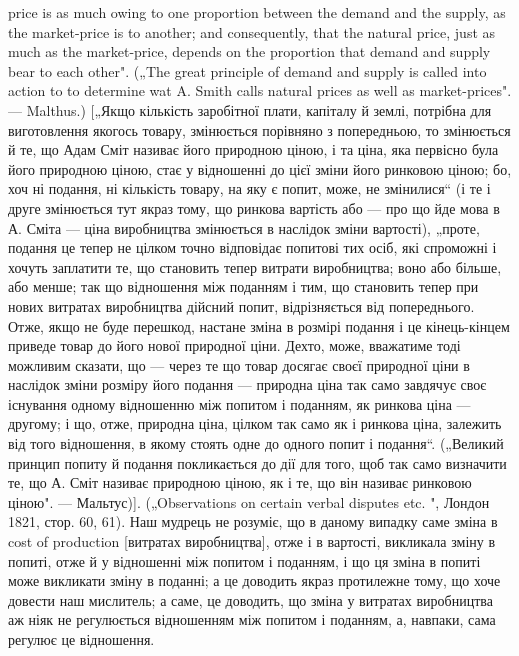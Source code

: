 price is as much owing to one proportion between the demand and the supply, as
the market-price is to another; and consequently, that the natural price, just as
much as the market-price, depends on the proportion that demand and supply
bear to each other". („The great principle of demand and supply is called into
action to to determine wat A. Smith calls natural prices as well as market-prices". —
Malthus.) [„Якщо кількість заробітної плати, капіталу й землі, потрібна для
виготовлення якогось товару, змінюється порівняно з попередньою, то змінюється
й те, що Адам Сміт називає його природною ціною, і та ціна, яка
первісно була його природною ціною, стає у відношенні до цієї зміни його
ринковою ціною; бо, хоч ні подання, ні кількість товару, на яку є попит,
може, не змінилися“ (і те і друге змінюється тут якраз тому, що ринкова
вартість або — про що йде мова в А. Сміта — ціна виробництва змінюється
в наслідок зміни вартості), „проте, подання це тепер не цілком точно відповідає
попитові тих осіб, які спроможні і хочуть заплатити те, що становить тепер
витрати виробництва; воно або більше, або менше; так що відношення між
поданням і тим, що становить тепер при нових витратах виробництва дійсний
попит, відрізняється від попереднього. Отже, якщо не буде перешкод,
настане зміна в розмірі подання і це кінець-кінцем приведе товар до його
нової природної ціни. Дехто, може, вважатиме тоді можливим сказати, що —
через те що товар досягає своєї природної ціни в наслідок зміни розміру
його подання — природна ціна так само завдячує своє існування одному відношенню
між попитом і поданням, як ринкова ціна — другому; і що, отже,
природна ціна, цілком так само як і ринкова ціна, залежить від того відношення,
в якому стоять одне до одного попит і подання“. („Великий принцип
попиту й подання покликається до дії для того, щоб так само визначити
те, що А. Сміт називає природною ціною, як і те, що він називає ринковою
ціною". — Мальтус)]. („Observations on certain verbal disputes etc. ", Лондон 1821,
стор. 60, 61). Наш мудрець не розуміє, що в даному випадку саме зміна в cost
of production [витратах виробництва], отже і в вартості, викликала зміну в попиті,
отже й у відношенні між попитом і поданням, і що ця зміна в попиті
може викликати зміну в поданні; а це доводить якраз протилежне тому, що
хоче довести наш мислитель; а саме, це доводить, що зміна у витратах виробництва
аж ніяк не регулюється відношенням між попитом і поданням, а, навпаки,
сама регулює це відношення.

